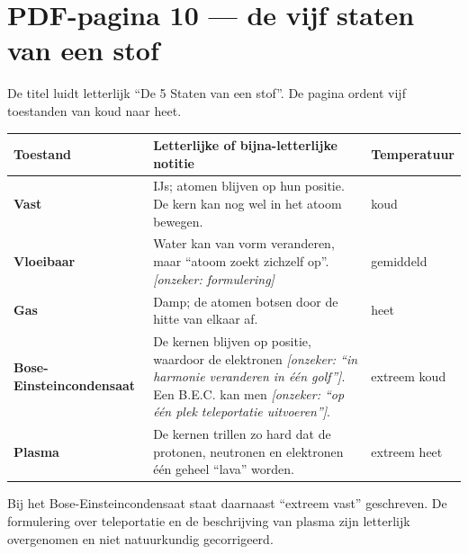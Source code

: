 \documentclass[11pt,a4paper]{article}
\newcommand{\uncertain}[1]{\textcolor{uncertain}{\textit{[onzeker: #1]}}}
\begin{document}
\newpage
\section*{PDF-pagina 10 --- de vijf staten van een stof}

De titel luidt letterlijk ``De 5 Staten van een stof''. De pagina ordent vijf
toestanden van koud naar heet.

\begin{center}
\begin{tabularx}{\textwidth}{>{\bfseries}l>{\raggedright\arraybackslash}Xl}
\toprule
\textbf{Toestand} & \textbf{Letterlijke of bijna-letterlijke notitie} &
\textbf{Temperatuur}\\
\midrule
Vast &
IJs; atomen blijven op hun positie. De kern kan nog wel in het atoom bewegen. &
koud\\
Vloeibaar &
Water kan van vorm veranderen, maar ``atoom zoekt zichzelf op''.
\uncertain{formulering} &
gemiddeld\\
Gas &
Damp; de atomen botsen door de hitte van elkaar af. &
heet\\
Bose-Einsteincondensaat &
De kernen blijven op positie, waardoor de elektronen
\uncertain{``in harmonie veranderen in één golf''}. Een B.E.C. kan men
\uncertain{``op één plek teleportatie uitvoeren''}. &
extreem koud\\
Plasma &
De kernen trillen zo hard dat de protonen, neutronen en elektronen
één geheel ``lava'' worden. &
extreem heet\\
\bottomrule
\end{tabularx}
\end{center}

Bij het Bose-Einsteincondensaat staat daarnaast ``extreem vast'' geschreven.
De formulering over teleportatie en de beschrijving van plasma zijn
letterlijk overgenomen en niet natuurkundig gecorrigeerd.
\end{document}
